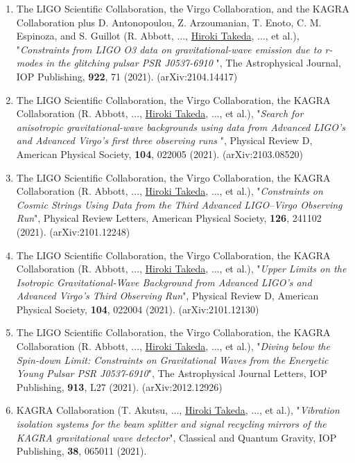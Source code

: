 \documentclass[uplatex, 11pt]{jsarticle}
\begin{document}
\begin{enumerate}
\item The LIGO Scientific Collaboration, the Virgo Collaboration, and the KAGRA Collaboration plus D. Antonopoulou, Z. Arzoumanian, T. Enoto, C. M. Espinoza, and S. Guillot (R. Abbott, ..., \uline{Hiroki Takeda}, ..., et al.), "\emph{Constraints from LIGO O3 data on gravitational-wave emission due to r-modes in the glitching pulsar PSR J0537-6910 }", The Astrophysical Journal, IOP Publishing, {\bf 922}, 71 (2021). (arXiv:2104.14417)\\

\item The LIGO Scientific Collaboration, the Virgo Collaboration, the KAGRA Collaboration (R. Abbott, ..., \uline{Hiroki Takeda}, ..., et al.), "\emph{Search for anisotropic gravitational-wave backgrounds using data from Advanced LIGO's and Advanced Virgo's first three observing runs }", Physical Review D, American Physical Society, {\bf 104}, 022005 (2021). (arXiv:2103.08520)\\

\item The LIGO Scientific Collaboration, the Virgo Collaboration, the KAGRA Collaboration (R. Abbott, ..., \uline{Hiroki Takeda}, ..., et al.), "\emph{Constraints on Cosmic Strings Using Data from the Third Advanced LIGO–Virgo Observing Run}", Physical Review Letters, American Physical Society, {\bf 126}, 241102 (2021). (arXiv:2101.12248)\\

\item The LIGO Scientific Collaboration, the Virgo Collaboration, the KAGRA Collaboration (R. Abbott, ..., \uline{Hiroki Takeda}, ..., et al.), "\emph{Upper Limits on the Isotropic Gravitational-Wave Background from Advanced LIGO's and Advanced Virgo's Third Observing Run}", Physical Review D, American Physical Society, {\bf 104}, 022004 (2021). (arXiv:2101.12130)\\

\item The LIGO Scientific Collaboration, the Virgo Collaboration, the KAGRA Collaboration (R. Abbott, ..., \uline{Hiroki Takeda}, ..., et al.), "\emph{Diving below the Spin-down Limit: Constraints on Gravitational Waves from the Energetic Young Pulsar PSR J0537-6910}", The Astrophysical Journal Letters, IOP Publishing, {\bf 913}, L27 (2021). (arXiv:2012.12926)\\

\item KAGRA Collaboration (T. Akutsu, ..., \uline{Hiroki Takeda}, ..., et al.),
"\emph{Vibration isolation systems for the beam splitter and signal recycling mirrors of the KAGRA gravitational wave detector}",
Classical and Quantum Gravity, IOP Publishing, {\bf 38}, 065011 (2021).\\


\end{enumerate}
\end{document}
